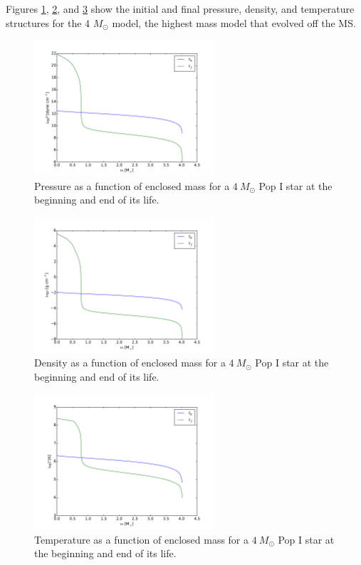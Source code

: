\documentclass[12pt]{paper}
\begin{document}
Figures \ref{fig:pse}, \ref{fig:dse}, and \ref{fig:tse} show the initial and final pressure, density, and temperature structures for the 4 $M_\odot$ model, the highest mass model that evolved off the MS.

\begin{figure}
\begin{center}
    \includegraphics[width=0.6\textwidth]{pres.pdf}
    \caption{Pressure as a function of enclosed mass for a $4~M_\odot$ Pop I star at the beginning and end of its life.}
    \label{fig:pse}
\end{center}
\end{figure}

\begin{figure}
\begin{center}
    \includegraphics[width=0.6\textwidth]{dens.pdf}
    \caption{Density as a function of enclosed mass for a $4~M_\odot$ Pop I star at the beginning and end of its life.}
    \label{fig:dse}
\end{center}
\end{figure}

\begin{figure}
\begin{center}
    \includegraphics[width=0.6\textwidth]{temp.pdf}
    \caption{Temperature as a function of enclosed mass for a $4~M_\odot$ Pop I star at the beginning and end of its life.}
    \label{fig:tse}
\end{center}
\end{figure}

\setlength\bibsep{0pt}


\end{document}
